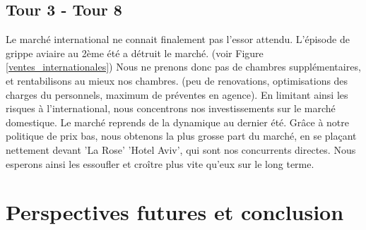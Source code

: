 \documentclass[a4paper,10pt]{article}
\begin{document}
    \subsection{Tour 3 - Tour 8}
      Le marché international ne connait finalement pas l'essor attendu. L'épisode de grippe aviaire au 2ème été a détruit le marché.
      (voir Figure \ref{ventes_internationales})
      Nous ne prenons donc pas de chambres supplémentaires, et rentabilisons au mieux nos chambres. (peu de renovations, optimisations des charges du personnels, maximum de préventes en agence).
      \newline
      En limitant ainsi les risques à l'international, nous concentrons nos investissements sur le marché domestique.
      \newline
      \newline
      Le marché reprends de la dynamique au dernier été. Grâce à notre politique de prix bas, nous obtenons la plus grosse part du marché, en se plaçant nettement devant
      'La Rose' 'Hotel Aviv', qui sont nos concurrents directes. Nous esperons ainsi les essoufler et croître plus vite qu'eux sur le long terme.

  \newpage
  \section{Perspectives futures et conclusion}
\end{document}
